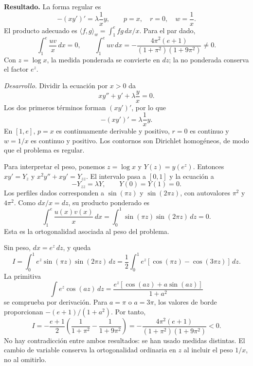 \noindent\textbf{Resultado.} La forma regular es
\[
-(xy')'=\lambda\frac1x y,
\qquad p=x,\quad r=0,\quad w=\frac1x.
\]
El producto adecuado es \(\langle f,g\rangle_w=\int_1^e fg\,dx/x\). Para el par dado,
\[
\int_1^e\frac{uv}{x}\,dx=0,\qquad
\int_1^e uv\,dx
=-\frac{4\pi^2(e+1)}{(1+\pi^2)(1+9\pi^2)}\ne0.
\]
Con \(z=\log x\), la medida ponderada se convierte en \(dz\); la no ponderada conserva el factor \(e^z\).

\noindent\textit{Desarrollo.} Dividir la ecuación por \(x>0\) da
\[
xy''+y'+\lambda\frac{y}{x}=0.
\]
Los dos primeros términos forman \((xy')'\), por lo que
\[
-(xy')'=\lambda\frac1x y.
\]
En \([1,e]\), \(p=x\) es continuamente derivable y positivo, \(r=0\) es continuo y \(w=1/x\) es continuo y positivo. Los contornos son Dirichlet homogéneos, de modo que el problema es regular.

Para interpretar el peso, ponemos \(z=\log x\) y \(Y(z)=y(e^z)\). Entonces \(xy'=Y_z\) y \(x^2y''+xy'=Y_{zz}\). El intervalo pasa a \([0,1]\) y la ecuación a
\[
-Y_{zz}=\lambda Y,\qquad Y(0)=Y(1)=0.
\]
Los perfiles dados corresponden a \(\sin(\pi z)\) y \(\sin(2\pi z)\), con autovalores \(\pi^2\) y \(4\pi^2\). Como \(dx/x=dz\), su producto ponderado es
\[
\int_1^e\frac{u(x)v(x)}x\,dx
=\int_0^1\sin(\pi z)\sin(2\pi z)\,dz=0.
\]
Esta es la ortogonalidad asociada al peso del problema.

Sin peso, \(dx=e^z\,dz\), y queda
\[
I=\int_0^1e^z\sin(\pi z)\sin(2\pi z)\,dz
=\frac12\int_0^1e^z[\cos(\pi z)-\cos(3\pi z)]\,dz.
\]
La primitiva
\[
\int e^z\cos(az)\,dz
=\frac{e^z[\cos(az)+a\sin(az)]}{1+a^2}
\]
se comprueba por derivación. Para \(a=\pi\) o \(a=3\pi\), los valores de borde proporcionan \(-(e+1)/(1+a^2)\). Por tanto,
\[
I=-\frac{e+1}{2}\left(\frac1{1+\pi^2}-\frac1{1+9\pi^2}\right)
=-\frac{4\pi^2(e+1)}{(1+\pi^2)(1+9\pi^2)}<0.
\]
No hay contradicción entre ambos resultados: se han usado medidas distintas. El cambio de variable conserva la ortogonalidad ordinaria en \(z\) al incluir el peso \(1/x\), no al omitirlo.
